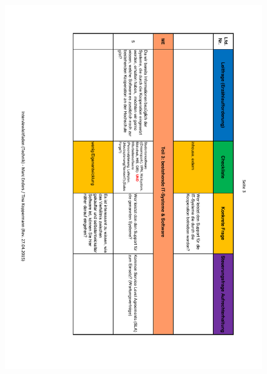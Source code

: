 \begin{figure}
	\centering
	\includegraphics[width=18cm]{kapitel/anhang/Interviewleitfaden_3}
\end{figure}

